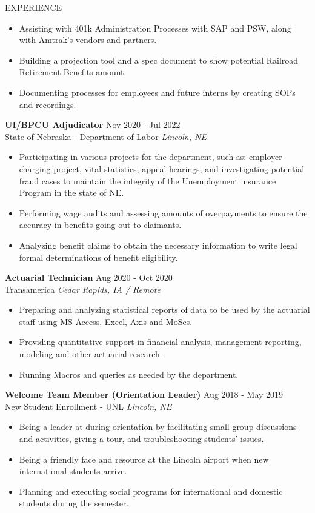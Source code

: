 \documentclass{resume} %
\begin{document}
\begin{rSection}{EXPERIENCE}
 \begin{itemize}
    \itemsep -1pt {}
     \item Assisting with 401k Administration Processes with SAP and PSW, along with Amtrak’s vendors and partners.
     \item Building a projection tool and a spec document to show potential Railroad Retirement Benefits amount.
     \item Documenting processes for employees and future interns by creating SOPs and recordings.
 \end{itemize}
\textbf{UI/BPCU Adjudicator} \hfill Nov 2020 - Jul 2022\\
 State of Nebraska - Department of Labor \hfill \textit{Lincoln, NE}
 \begin{itemize}
    \itemsep -1pt {}
     \item Participating in various projects for the department, such as: employer charging project, vital statistics, appeal hearings, and investigating potential fraud cases to maintain the integrity of the Unemployment insurance Program in the state of NE.
     \item Performing wage audits and assessing amounts of overpayments to ensure the accuracy in benefits going out to claimants.
     \item Analyzing benefit claims to obtain the necessary information to write legal formal determinations of benefit eligibility.
 \end{itemize}
 \textbf{Actuarial Technician} \hfill Aug 2020 - Oct 2020\\
 Transamerica \hfill \textit{Cedar Rapids, IA / Remote}
 \begin{itemize}
    \itemsep -1pt {}
     \item Preparing and analyzing statistical reports of data to be used by the actuarial staff using MS Access, Excel, Axis and MoSes.
     \item Providing quantitative support in financial analysis, management reporting, modeling and other actuarial research.
     \item Running Macros and queries as needed by the department.
 \end{itemize}
 \textbf{Welcome Team Member (Orientation Leader)} \hfill Aug 2018 - May 2019\\
 New Student Enrollment - UNL \hfill \textit{Lincoln, NE}
 \begin{itemize}
    \itemsep -1pt {}
     \item Being a leader at during orientation by facilitating small-group discussions and activities, giving a tour, and troubleshooting students' issues.
     \item Being a friendly face and resource at the Lincoln airport when new international students arrive.
     \item Planning and executing social programs for international and domestic students during the semester.
 \end{itemize}
\end{rSection}
\end{document}
